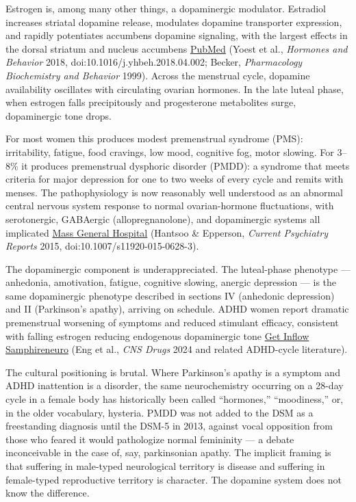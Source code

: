 Estrogen is, among many other things, a dopaminergic modulator. Estradiol increases striatal dopamine release, modulates dopamine transporter expression, and rapidly potentiates accumbens dopamine signaling, with the largest effects in the dorsal striatum and nucleus accumbens \href{https://pubmed.ncbi.nlm.nih.gov/29626485/}{PubMed} (Yoest et al., \emph{Hormones and Behavior} 2018, doi:10.1016/j.yhbeh.2018.04.002; Becker, \emph{Pharmacology Biochemistry and Behavior} 1999). Across the menstrual cycle, dopamine availability oscillates with circulating ovarian hormones. In the late luteal phase, when estrogen falls precipitously and progesterone metabolites surge, dopaminergic tone drops.

For most women this produces modest premenstrual syndrome (PMS): irritability, fatigue, food cravings, low mood, cognitive fog, motor slowing. For 3--8\% it produces premenstrual dysphoric disorder (PMDD): a syndrome that meets criteria for major depression for one to two weeks of every cycle and remits with menses. The pathophysiology is now reasonably well understood as an abnormal central nervous system response to normal ovarian-hormone fluctuations, with serotonergic, GABAergic (allopregnanolone), and dopaminergic systems all implicated \href{https://womensmentalhealth.org/specialty-clinics/pms-and-pmdd/}{Mass General Hospital} (Hantsoo \& Epperson, \emph{Current Psychiatry Reports} 2015, doi:10.1007/s11920-015-0628-3).

The dopaminergic component is underappreciated. The luteal-phase phenotype --- anhedonia, amotivation, fatigue, cognitive slowing, anergic depression --- is the same dopaminergic phenotype described in sections IV (anhedonic depression) and II (Parkinson's apathy), arriving on schedule. ADHD women report dramatic premenstrual worsening of symptoms and reduced stimulant efficacy, consistent with falling estrogen reducing endogenous dopaminergic tone \href{https://www.getinflow.io/post/pmdd-estrogen-dopamine-adhd-affected-by-severe-pms}{Get Inflow} \href{https://www.samphireneuro.com/en-us/blog/connection-between-adhd-and-menstrual-cycle}{Samphireneuro} (Eng et al., \emph{CNS Drugs} 2024 and related ADHD-cycle literature).

The cultural positioning is brutal. Where Parkinson's apathy is a symptom and ADHD inattention is a disorder, the same neurochemistry occurring on a 28-day cycle in a female body has historically been called ``hormones,'' ``moodiness,'' or, in the older vocabulary, hysteria. PMDD was not added to the DSM as a freestanding diagnosis until the DSM-5 in 2013, against vocal opposition from those who feared it would pathologize normal femininity --- a debate inconceivable in the case of, say, parkinsonian apathy. The implicit framing is that suffering in male-typed neurological territory is disease and suffering in female-typed reproductive territory is character. The dopamine system does not know the difference.

